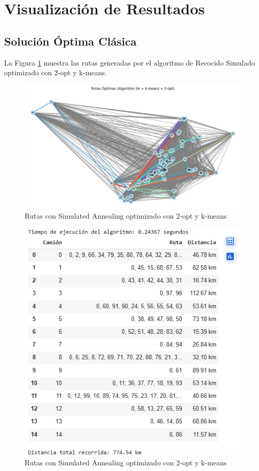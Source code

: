 \documentclass[11pt,a4paper,spanish]{book}
\begin{document}
\section{Visualización de Resultados}

\subsection{Solución Óptima Clásica}

La Figura \ref{fig:solucionSA2opt} muestra las rutas generadas por el algoritmo de Recocido Simulado optimizado con 2-opt y k-means.

\begin{figure}[H]
\centering
\includegraphics[width=1\linewidth]{SA.png}
\caption{Rutas con Simulated Annealing optimizado con 2-opt y k-means}
\label{fig:solucionSA2opt}
\end{figure}

\begin{figure}[H]
\centering
\includegraphics[width=0.6\linewidth]{tablaSA.png}
\caption{Rutas con Simulated Annealing optimizado con 2-opt y k-means}
\label{fig:tablaSA}
\end{figure}
\end{document}
